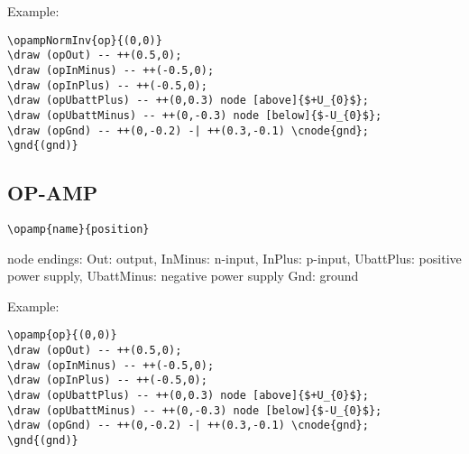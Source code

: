 \documentclass[parskip=full]{scrartcl}
\begin{document}
Example:\\
\begin{minipage}{0.8\textwidth}
\begin{verbatim}
\opampNormInv{op}{(0,0)}
\draw (opOut) -- ++(0.5,0);
\draw (opInMinus) -- ++(-0.5,0);
\draw (opInPlus) -- ++(-0.5,0);
\draw (opUbattPlus) -- ++(0,0.3) node [above]{$+U_{0}$};
\draw (opUbattMinus) -- ++(0,-0.3) node [below]{$-U_{0}$};
\draw (opGnd) -- ++(0,-0.2) -| ++(0.3,-0.1) \cnode{gnd};
\gnd{(gnd)}
\end{verbatim}
\end{minipage}
\begin{minipage}{0.19\textwidth}
\end{minipage}

\subsection{OP-AMP}

\begin{verbatim}
\opamp{name}{position}
\end{verbatim}
node endings: Out: output, InMinus: n-input, InPlus: p-input,
              UbattPlus: positive power supply,
              UbattMinus: negative power supply
              Gnd: ground

Example:\\
\begin{minipage}{0.8\textwidth}
\begin{verbatim}
\opamp{op}{(0,0)}
\draw (opOut) -- ++(0.5,0);
\draw (opInMinus) -- ++(-0.5,0);
\draw (opInPlus) -- ++(-0.5,0);
\draw (opUbattPlus) -- ++(0,0.3) node [above]{$+U_{0}$};
\draw (opUbattMinus) -- ++(0,-0.3) node [below]{$-U_{0}$};
\draw (opGnd) -- ++(0,-0.2) -| ++(0.3,-0.1) \cnode{gnd};
\gnd{(gnd)}
\end{verbatim}
\end{minipage}
\begin{minipage}{0.19\textwidth}
\end{minipage}
\end{document}
